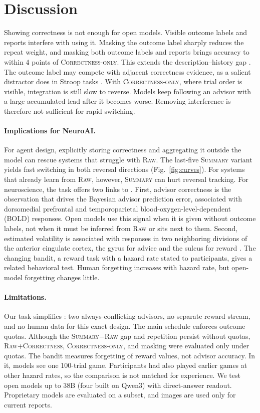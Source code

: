 \documentclass[letterpaper]{article} %
\newcommand{\Raw}{\textsc{Raw}}
\newcommand{\RawCorrectness}{\textsc{Raw+Correctness}}
\newcommand{\CorrectnessOnly}{\textsc{Correctness-only}}
\newcommand{\Summary}{\textsc{Summary}}
\begin{document}
\section{Discussion}
Showing correctness is not enough for open models. Visible outcome labels and reports interfere with using it. Masking the outcome label sharply reduces the repeat weight, and masking both outcome labels and reports brings accuracy to within 4 points of \CorrectnessOnly{}. This extends the description--history gap \citep{ge2026dhgap}. The outcome label may compete with adjacent correctness evidence, as a salient distractor does in Stroop tasks \citep{macleod1991half}. With \CorrectnessOnly{}, where trial order is visible, integration is still slow to reverse. Models keep following an advisor with a large accumulated lead after it becomes worse. Removing interference is therefore not sufficient for rapid switching.

\paragraph{Implications for NeuroAI.} For agent design, explicitly storing correctness and aggregating it outside the model can rescue systems that struggle with \Raw{}. The last-five \Summary{} variant yields fast switching in both reversal directions (Fig.~\ref{fig:curves}). For systems that already learn from \Raw{}, however, \Summary{} can hurt reversal tracking. For neuroscience, the task offers two links to \citet{behrens2008associative}. First, advisor correctness is the observation that drives the Bayesian advisor prediction error, associated with dorsomedial prefrontal and temporoparietal blood-oxygen-level-dependent (BOLD) responses. Open models use this signal when it is given without outcome labels, not when it must be inferred from \Raw{} or sits next to them. Second, estimated volatility is associated with responses in two neighboring divisions of the anterior cingulate cortex, the gyrus for advice and the sulcus for reward \citep{behrens2008associative,behrens2007learning}. The changing bandit, a reward task with a hazard rate stated to participants, gives a related behavioral test. Human forgetting increases with hazard rate, but open-model forgetting changes little.

\paragraph{Limitations.} Our task simplifies \citet{behrens2008associative}: two always-conflicting advisors, no separate reward stream, and no human data for this exact design. The main schedule enforces outcome quotas. Although the \Summary{}$-$\Raw{} gap and repetition persist without quotas, \RawCorrectness{}, \CorrectnessOnly{}, and masking were evaluated only under quotas. The bandit measures forgetting of reward values, not advisor accuracy. In it, models see one 100-trial game. Participants had also played earlier games at other hazard rates, so the comparison is not matched for experience. We test open models up to 38B (four built on Qwen3) with direct-answer readout. Proprietary models are evaluated on a subset, and images are used only for current reports.
\end{document}
